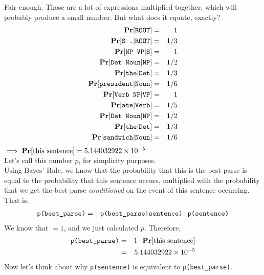 \documentclass[11pt]{article}
\newcommand{\prob}[1]{\ensuremath{\text{{\bf Pr}$\left[#1\right]$}}}
\newcommand{\code}[1]{\texttt{#1}}
\begin{document}
\begin{enumerate}
\begin{enumerate}[label=(\roman*)]
		Fair enough. Those are a lot of expressions multiplied together, which will probably produce a small number. But what does it equate, exactly?
		\begin{eqnarray*}
			\prob{\code{ROOT}}             &=& 1 \\
			\prob{\code{S .} | \code{ROOT}} &=& 1/3 \\
                        	\prob{\code{NP VP} | \code{S}}        &=& 1 \\
                        	\prob{\code{Det Noun} | \code{NP}}    &=& 1/2 \\
                        	\prob{\code{the} | \code{Det}}        &=& 1/3 \\
                        	\prob{\code{president} | \code{Noun}} &=& 1/6 \\
                        	\prob{\code{Verb NP} | \code{VP}}     &=& 1 \\
                        	\prob{\code{ate} | \code{Verb}}      &=& 1/5 \\
                        	\prob{\code{Det Noun} | \code{NP}}    &=& 1/2 \\
                        	\prob{\code{the} | \code{Det}}        &=& 1/3 \\
                        	\prob{\code{sandwich} | \code{Noun}}  &=& 1/6 \\
		\end{eqnarray*}
		$\implies \prob{\text{this sentence}} = 5.144032922 \times 10^{-5}$ \vspace{4pt} \\
		Let's call this number $p$, for simplicity purposes. \vspace{4pt} \\
		Using Bayes' Rule, we know that the probability that this is the best parse is equal to the probability that this sentence occurs, multiplied with the probability that we get the best parse \textit{conditioned} on the event of this sentence occurring. That is, 
		\begin{eqnarray*}
			\text{\code{p(best\_parse)}} &=& \text{\code{p(best\_parse|sentence)}} \cdot \text{\code{p(sentence)}}
		\end{eqnarray*}
		We know that \text{\code{p(best\_parse|sentence)}} $= 1$, and we just calculated $p$. Therefore,
		\begin{eqnarray*}
			\text{\code{p(best\_parse)}} &=& 1 \cdot \prob{\text{this sentence}} \\
			&=& 5.144032922 \times 10^{-5}
		\end{eqnarray*}
		Now let's think about why \code{p(sentence)} is equivalent to \code{p(best\_parse)}. 
		

\end{enumerate}
\end{enumerate}
\end{document}
